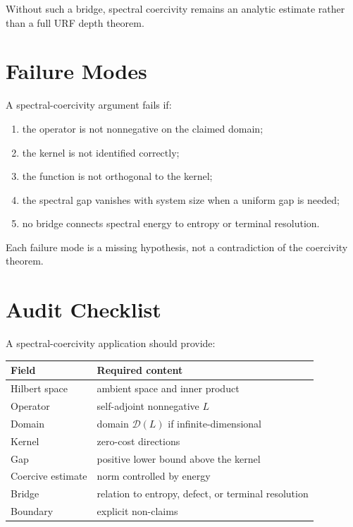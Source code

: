 Without such a bridge, spectral coercivity remains an analytic estimate rather
than a full URF depth theorem.

\section{Failure Modes}

A spectral-coercivity argument fails if:

\begin{enumerate}
\item the operator is not nonnegative on the claimed domain;
\item the kernel is not identified correctly;
\item the function is not orthogonal to the kernel;
\item the spectral gap vanishes with system size when a uniform gap is needed;
\item no bridge connects spectral energy to entropy or terminal resolution.
\end{enumerate}

Each failure mode is a missing hypothesis, not a contradiction of the
coercivity theorem.

\section{Audit Checklist}

A spectral-coercivity application should provide:

\begin{center}
\begin{tabular}{ll}
\toprule
Field & Required content \\
\midrule
Hilbert space & ambient space and inner product \\
Operator & self-adjoint nonnegative \(L\) \\
Domain & domain \(\mathcal D(L)\) if infinite-dimensional \\
Kernel & zero-cost directions \\
Gap & positive lower bound above the kernel \\
Coercive estimate & norm controlled by energy \\
Bridge & relation to entropy, defect, or terminal resolution \\
Boundary & explicit non-claims \\
\bottomrule
\end{tabular}
\end{center}

